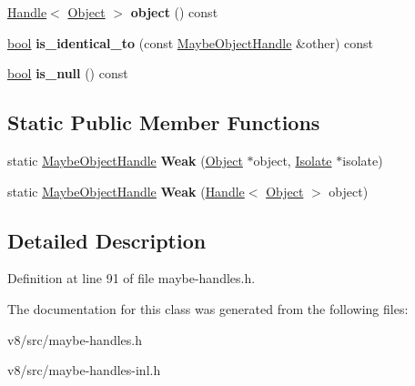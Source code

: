\begin{DoxyCompactItemize}
\mbox{\label{classv8_1_1internal_1_1MaybeObjectHandle_a630f9db1c1d9da1e07063af16163103c}} 
\mbox{\hyperlink{classv8_1_1internal_1_1Handle}{Handle}}$<$ \mbox{\hyperlink{classv8_1_1internal_1_1Object}{Object}} $>$ {\bfseries object} () const
\item 
\mbox{\label{classv8_1_1internal_1_1MaybeObjectHandle_a6f90446119fae92d47119e4b355b773f}} 
\mbox{\hyperlink{classbool}{bool}} {\bfseries is\+\_\+identical\+\_\+to} (const \mbox{\hyperlink{classv8_1_1internal_1_1MaybeObjectHandle}{Maybe\+Object\+Handle}} \&other) const
\item 
\mbox{\label{classv8_1_1internal_1_1MaybeObjectHandle_af0cabef77ecabb90bd8db3841c70a770}} 
\mbox{\hyperlink{classbool}{bool}} {\bfseries is\+\_\+null} () const
\end{DoxyCompactItemize}
\subsection*{Static Public Member Functions}
\begin{DoxyCompactItemize}
\item 
\mbox{\label{classv8_1_1internal_1_1MaybeObjectHandle_aa2fc1ca68e045aa3792bf4860ce8fce1}} 
static \mbox{\hyperlink{classv8_1_1internal_1_1MaybeObjectHandle}{Maybe\+Object\+Handle}} {\bfseries Weak} (\mbox{\hyperlink{classv8_1_1internal_1_1Object}{Object}} $\ast$object, \mbox{\hyperlink{classv8_1_1internal_1_1Isolate}{Isolate}} $\ast$isolate)
\item 
\mbox{\label{classv8_1_1internal_1_1MaybeObjectHandle_a5e76068a481bf27c0467cef3cc0abae4}} 
static \mbox{\hyperlink{classv8_1_1internal_1_1MaybeObjectHandle}{Maybe\+Object\+Handle}} {\bfseries Weak} (\mbox{\hyperlink{classv8_1_1internal_1_1Handle}{Handle}}$<$ \mbox{\hyperlink{classv8_1_1internal_1_1Object}{Object}} $>$ object)
\end{DoxyCompactItemize}


\subsection{Detailed Description}


Definition at line 91 of file maybe-\/handles.\+h.



The documentation for this class was generated from the following files\+:\begin{DoxyCompactItemize}
\item 
v8/src/maybe-\/handles.\+h\item 
v8/src/maybe-\/handles-\/inl.\+h\end{DoxyCompactItemize}
